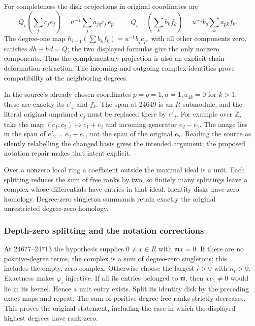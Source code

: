 For completeness the disk projections in original coordinates are \[
 Q_i\!\left(\sum_j c_je_j\right)
   =u^{-1}\!\sum_j a_{jq}c_j\,e_p,\qquad
 Q_{i-1}\!\left(\sum_k b_kf_k\right)
   =u^{-1}b_q\sum_k a_{pk}f_k .
\] The degree-one map \(h_{i-1}(\sum b_kf_k)=u^{-1}b_qe_p\), with all other components zero, satisfies \(dh+hd=Q\); the two displayed formulas give the only nonzero components. Thus the complementary projection is also an explicit chain deformation retraction. The incoming and outgoing complex identities prove compatibility at the neighboring degrees.

In the source's already chosen coordinates \(p=q=1,u=1,a_{1k}=0\) for \(k>1\), these are exactly its \(e'_j\) and \(f_k\). The span at 24649 is an \(R\)-submodule, and the literal original unprimed \(e_j\) must be replaced there by \(e'_j\). For example over \(\mathbb Z\), take the map \((c_1,c_2)\mapsto c_1+c_2\) and incoming generator \(e_2-e_1\). The image lies in the span of \(e'_2=e_2-e_1\), not the span of the original \(e_2\). Reading the source as silently relabelling the changed basis gives the intended argument; the proposed notation repair makes that intent explicit.

Over a nonzero local ring a coefficient outside the maximal ideal is a unit. Each splitting reduces the sum of free ranks by two, so finitely many splittings leave a complex whose differentials have entries in that ideal. Identity disks have zero homology. Degree-zero singleton summands retain exactly the original unrestricted degree-zero homology.

\subsubsection{Depth-zero splitting and the notation corrections}\label{depth-zero-splitting-and-the-notation-corrections}

At 24677--24713 the hypothesis supplies \(0\ne x\in R\) with \(\mathfrak m x=0\). If there are no positive-degree terms, the complex is a sum of degree-zero singletons; this includes the empty, zero complex. Otherwise choose the largest \(i>0\) with \(n_i>0\). Exactness makes \(\varphi_i\) injective. If all its entries belonged to \(\mathfrak m\), then \(xe_1\ne0\) would lie in its kernel. Hence a unit entry exists. Split its identity disk by the preceding exact maps and repeat. The sum of positive-degree free ranks strictly decreases. This proves the original statement, including the case in which the displayed highest degrees have rank zero.

